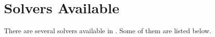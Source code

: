 \chapter{Solvers Available}
\label{Solvers Available}

There are several solvers available in \hypre{}.  Some of them are
listed below.
